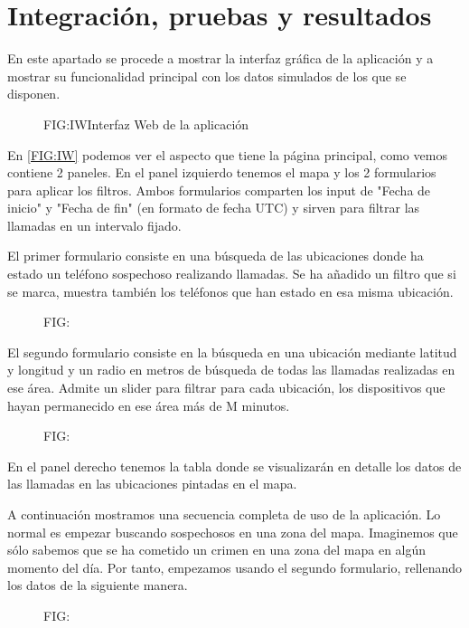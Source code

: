 \chapter{Integración, pruebas y resultados\label{CAP:IPR}}
  En este apartado se procede a mostrar la interfaz gráfica de la aplicación y a mostrar su funcionalidad principal con los datos simulados de los que se disponen.
  
  \begin{figure}[Interfaz Web de la aplicación]{FIG:IW}{Interfaz Web de la aplicación}
  \end{figure}
  
  En \ref{FIG:IW} podemos ver el aspecto que tiene la página principal, como vemos contiene 2 paneles. 
  En el panel izquierdo tenemos el mapa y los 2 formularios para aplicar los filtros. Ambos formularios comparten los input de "Fecha de inicio" y "Fecha de fin" (en formato de fecha UTC) y sirven para filtrar las llamadas en un intervalo fijado.
  
  El primer formulario consiste en una búsqueda de las ubicaciones donde ha estado un teléfono sospechoso realizando llamadas. Se ha añadido un filtro que si se marca, muestra también los teléfonos que han estado en esa misma ubicación.
  \begin{figure}[]{FIG:}{}
    \image{}{}{}
  \end{figure}
  El segundo formulario consiste en la búsqueda en una ubicación mediante latitud y longitud y un radio en metros de búsqueda de todas las llamadas realizadas en ese área.
  Admite un slider para filtrar para cada ubicación, los dispositivos que hayan permanecido en ese área más de M minutos.
  \begin{figure}[]{FIG:}{}
    \image{}{}{}
  \end{figure}
  
  En el panel derecho tenemos la tabla donde se visualizarán en detalle los datos de las llamadas en las ubicaciones pintadas en el mapa.
  
  A continuación mostramos una secuencia completa de uso de la aplicación.
  Lo normal es empezar buscando sospechosos en una zona del mapa. Imaginemos que sólo sabemos que se ha cometido un crimen en una zona del mapa en algún momento del día.
  Por tanto, empezamos usando el segundo formulario, rellenando los datos de la siguiente manera.
  \begin{figure}[]{FIG:}{}
    \image{}{}{}
  \end{figure}

